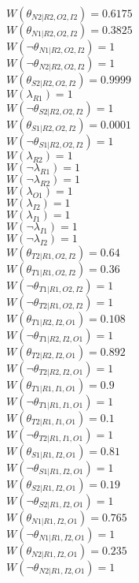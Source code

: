 $W(\theta_{N2|R2,O2,I2})=0.6175$\\
$W(\theta_{N1|R2,O2,I2})=0.3825$\\
$W(\neg\theta_{N1|R2,O2,I2})=1$\\
$W(\neg\theta_{N2|R2,O2,I2})=1$\\
$W(\theta_{S2|R2,O2,I2})=0.9999$\\
$W(\lambda_{R1})=1$\\
$W(\neg\theta_{S2|R2,O2,I2})=1$\\
$W(\theta_{S1|R2,O2,I2})=0.0001$\\
$W(\neg\theta_{S1|R2,O2,I2})=1$\\
$W(\lambda_{R2})=1$\\
$W(\neg\lambda_{R1})=1$\\
$W(\neg\lambda_{R2})=1$\\
$W(\lambda_{O1})=1$\\
$W(\lambda_{I2})=1$\\
$W(\lambda_{I1})=1$\\
$W(\neg\lambda_{I1})=1$\\
$W(\neg\lambda_{I2})=1$\\
$W(\theta_{T2|R1,O2,I2})=0.64$\\
$W(\theta_{T1|R1,O2,I2})=0.36$\\
$W(\neg\theta_{T1|R1,O2,I2})=1$\\
$W(\neg\theta_{T2|R1,O2,I2})=1$\\
$W(\theta_{T1|R2,I2,O1})=0.108$\\
$W(\neg\theta_{T1|R2,I2,O1})=1$\\
$W(\theta_{T2|R2,I2,O1})=0.892$\\
$W(\neg\theta_{T2|R2,I2,O1})=1$\\
$W(\theta_{T1|R1,I1,O1})=0.9$\\
$W(\neg\theta_{T1|R1,I1,O1})=1$\\
$W(\theta_{T2|R1,I1,O1})=0.1$\\
$W(\neg\theta_{T2|R1,I1,O1})=1$\\
$W(\theta_{S1|R1,I2,O1})=0.81$\\
$W(\neg\theta_{S1|R1,I2,O1})=1$\\
$W(\theta_{S2|R1,I2,O1})=0.19$\\
$W(\neg\theta_{S2|R1,I2,O1})=1$\\
$W(\theta_{N1|R1,I2,O1})=0.765$\\
$W(\neg\theta_{N1|R1,I2,O1})=1$\\
$W(\theta_{N2|R1,I2,O1})=0.235$\\
$W(\neg\theta_{N2|R1,I2,O1})=1$\\
